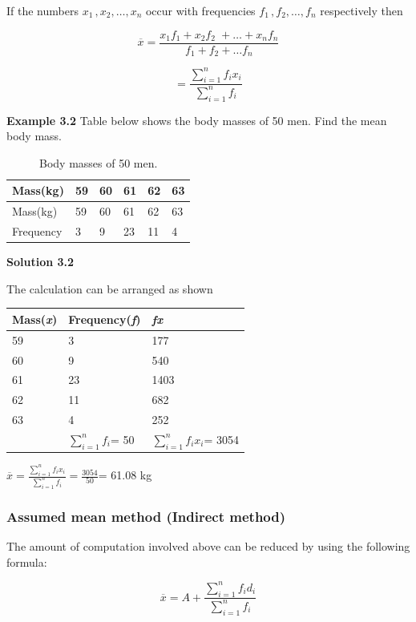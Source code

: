 \documentclass[
]{book}
\begin{document}
If the numbers \(x_{1\ },x_{2},\ldots,x_{n}\) occur with frequencies
\(f_{1\ },f_{2},\ldots,f_{n}\) respectively then

\[\overline{x} = \frac{x_{1}f_{1} + x_{2}f_{2\ \ } + \ldots + x_{n}f_{n}}{f_{1} + f_{2} + \ldots f_{n}}\]

\[= \frac{\sum_{i = 1}^{n}{f_{i}x_{i}}}{\sum_{i = 1}^{n}f_{i}}\]

\textbf{Example 3.2} Table below shows the body masses of 50 men. Find the
mean body mass.

\begin{longtable}[]{@{}llllll@{}}
\caption{\label{tab:bodymass} Body masses of 50 men.}\tabularnewline
\toprule
Mass(kg) & 59 & 60 & 61 & 62 & 63 \\
\midrule
\endfirsthead
\toprule
Mass(kg) & 59 & 60 & 61 & 62 & 63 \\
\midrule
\endhead
Frequency & 3 & 9 & 23 & 11 & 4 \\
\bottomrule
\end{longtable}

\textbf{Solution 3.2}

The calculation can be arranged as shown

\begin{longtable}[]{@{}lll@{}}
\toprule
Mass(\emph{x}) & Frequency(\emph{f}) & \emph{fx} \\
\midrule
\endhead
59 & 3 & 177 \\
60 & 9 & 540 \\
61 & 23 & 1403 \\
62 & 11 & 682 \\
63 & 4 & 252 \\
& \(\sum_{i = 1}^{n}f_{i}\)= 50 & \(\sum_{i = 1}^{n}{f_{i}x_{i}}\)= 3054 \\
\bottomrule
\end{longtable}

\(\overline{x} = \frac{\sum_{i = 1}^{n}{f_{i}x_{i}}}{\sum_{i = 1}^{n}f_{i}} = \frac{3054}{50}\)=
61.08 kg

\hypertarget{assumed-mean-method-indirect-method}{%
\subsubsection{Assumed mean method (Indirect method)}\label{assumed-mean-method-indirect-method}}

The amount of computation involved above can be reduced by using the
following formula:

\[\overline{x} = A + \frac{\sum_{i = 1}^{n}{f_{i}d_{i}}}{\sum_{i = 1}^{n}f_{i}}\]
\end{document}
